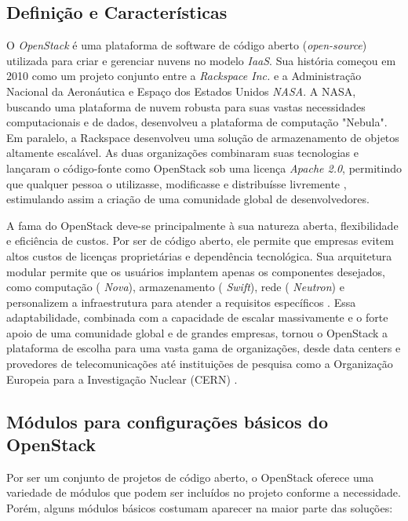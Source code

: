 \subsection{Definição e Características}

O  \textit{OpenStack} é uma plataforma de software de código aberto (\textit{open-source}) utilizada para criar e gerenciar nuvens no modelo \textit{IaaS}. Sua história começou em 2010 como um projeto conjunto entre a  \textit{Rackspace Inc.} e a Administração Nacional da Aeronáutica e Espaço dos Estados Unidos \textit{NASA}. A NASA, buscando uma plataforma de nuvem robusta para suas vastas necessidades computacionais e de dados, desenvolveu a plataforma de computação "Nebula". Em paralelo, a Rackspace desenvolveu uma solução de armazenamento de objetos altamente escalável. As duas organizações combinaram suas tecnologias e lançaram o código-fonte como OpenStack sob uma licença  \textit{Apache 2.0}, permitindo que qualquer pessoa o utilizasse, modificasse e distribuísse livremente \cite{nasa2012}, estimulando assim a criação de uma comunidade global de desenvolvedores.

A fama do OpenStack deve-se principalmente à sua natureza aberta, flexibilidade e eficiência de custos. Por ser de código aberto, ele permite que empresas evitem altos custos de licenças proprietárias e dependência tecnológica. Sua arquitetura modular permite que os usuários implantem apenas os componentes desejados, como computação ( \textit{Nova}), armazenamento ( \textit{Swift}), rede ( \textit{Neutron}) e personalizem a infraestrutura para atender a requisitos específicos \cite{grzonka2015}. Essa adaptabilidade, combinada com a capacidade de escalar massivamente e o forte apoio de uma comunidade global e de grandes empresas, tornou o OpenStack a plataforma de escolha para uma vasta gama de organizações, desde data centers e provedores de telecomunicações até instituições de pesquisa como a Organização Europeia para a Investigação Nuclear (CERN) \cite{rousseau2019}.

\subsection{Módulos para configurações básicos do OpenStack}

Por ser um conjunto de projetos de código aberto, o OpenStack oferece uma variedade de módulos que podem ser incluídos no projeto conforme a necessidade. Porém, alguns módulos básicos costumam aparecer na maior parte das soluções:

